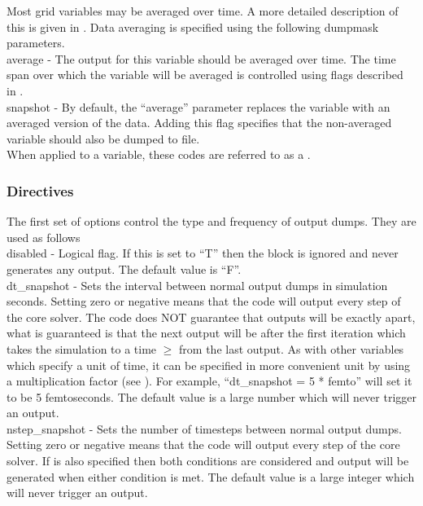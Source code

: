 Most grid variables may be averaged over time. A more detailed description
of this is given in . Data averaging is specified using
the following dumpmask parameters.\\

{\emphtext average} - The output for this variable should be averaged over
time. The time span over which the variable will be averaged is controlled
using flags described in .\\

{\emphtext snapshot} - By default, the ``average'' parameter replaces the
variable with an averaged version of the data. Adding this flag specifies
that the non-averaged variable should also be dumped to file.\\

When applied to a variable, these codes are referred to as a
.

\subsubsection{Directives}
\label{sec:output_directives}
The first set of options control the type and frequency of output dumps. They
are used as follows\\

{\emphtext disabled} - Logical flag. If this is set to ``T'' then the block
is ignored and never generates any output. The default value is ``F''.\\

{\emphtext dt\_snapshot} - Sets the interval between normal output dumps in
simulation seconds. Setting zero or negative means that the code will output
every step of the core solver. The code does NOT guarantee that outputs will be
exactly  apart, what is guaranteed is that the next
output will be after the first iteration which takes the simulation to a time
$\ge$  from the last output.
As with other variables which specify a unit of time, it can be specified
in more convenient unit by using a multiplication factor (see
). For example, ``dt\_snapshot = 5 * femto'' will set
it to be 5 femtoseconds.
The default value is a large number which will never trigger an output.\\

{\emphtext nstep\_snapshot} - Sets the number of timesteps between normal
output dumps. Setting zero or negative means that the code will output
every step of the core solver. If  is also specified
then both conditions are considered and output will be generated when either
condition is met. The default value is a large integer
which will never trigger an output.\\

